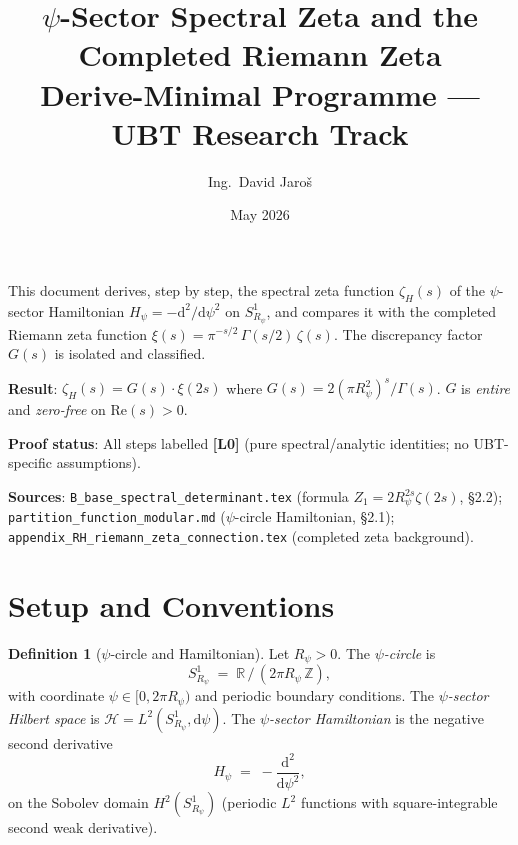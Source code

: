 \documentclass[11pt,a4paper]{article}
\title{\textbf{$\psi$-Sector Spectral Zeta and the Completed Riemann Zeta}\\[4pt]
\large Derive-Minimal Programme — UBT Research Track}
\author{Ing.\ David Jaroš}
\date{May 2026}
\theoremstyle{definition}
\newtheorem{definition}[theorem]{Definition}
\theoremstyle{remark}
\newcommand{\Rp}{R_{\psi}}
\newcommand{\Gam}{\Gamma}
\newcommand{\Hp}{H_{\psi}}
\begin{document}
\maketitle
\tableofcontents
\bigskip

\begin{tcolorbox}[colback=blue!4!white, colframe=blue!50!black, title=Purpose and status]
This document derives, step by step, the spectral zeta function
$\zeta_H(s)$ of the $\psi$-sector Hamiltonian
$H_\psi = -\mathrm{d}^2/\mathrm{d}\psi^2$
on $S^1_{R_\psi}$, and compares it with the completed Riemann zeta function
$\xi(s) = \pi^{-s/2}\,\Gam(s/2)\,\zeta(s)$.
The discrepancy factor $G(s)$ is isolated and classified.

\medskip\noindent
\textbf{Result}: $\zeta_H(s) = G(s)\cdot\xi(2s)$
where $G(s) = 2(\pi\Rp^2)^s/\Gam(s)$.
$G$ is \emph{entire} and \emph{zero-free} on $\mathrm{Re}(s)>0$.

\medskip\noindent
\textbf{Proof status}: All steps labelled \textbf{[L0]}
(pure spectral/analytic identities; no UBT-specific assumptions).

\medskip\noindent
\textbf{Sources}: \texttt{B\_base\_spectral\_determinant.tex} (formula $Z_1=2R_\psi^{2s}\zeta(2s)$, §2.2); \\
\texttt{partition\_function\_modular.md} ($\psi$-circle Hamiltonian, §2.1); \\
\texttt{appendix\_RH\_riemann\_zeta\_connection.tex} (completed zeta background).
\end{tcolorbox}

\section{Setup and Conventions}
\label{sec:setup}

\begin{definition}[$\psi$-circle and Hamiltonian]\label{def:Hpsi}
Let $\Rp > 0$.  The \emph{$\psi$-circle} is
\[
  S^1_{\Rp} \;=\; \mathbb{R}\,/\,(2\pi\Rp\,\mathbb{Z}),
\]
with coordinate $\psi \in [0, 2\pi\Rp)$ and periodic boundary conditions.
The \emph{$\psi$-sector Hilbert space} is
$\mathcal{H} = L^2(S^1_{\Rp}, \mathrm{d}\psi)$.
The \emph{$\psi$-sector Hamiltonian} is the negative second derivative
\[
  \Hp \;=\; -\frac{\mathrm{d}^2}{\mathrm{d}\psi^2},
\]
on the Sobolev domain $H^2(S^1_{\Rp})$ (periodic $L^2$ functions with
square-integrable second weak derivative).
\end{definition}
\end{document}
